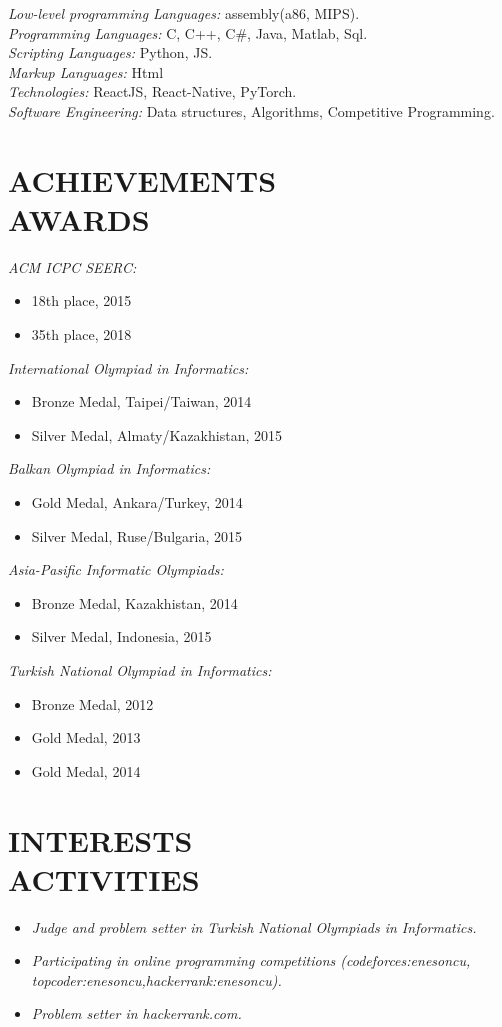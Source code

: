 \documentclass[margin, 10pt]{res} %
\begin{document}
\begin{resume}
{\sl Low-level programming Languages:} assembly(a86, MIPS). \\
{\sl Programming Languages:} C, C++, C#, Java, Matlab, Sql. \\
{\sl Scripting Languages:} Python, JS. \\
{\sl Markup Languages:} Html \\
{\sl Technologies:} ReactJS, React-Native, PyTorch. \\
{\sl Software Engineering:} Data structures, Algorithms, Competitive Programming.

\section{ACHIEVEMENTS \\ AWARDS}
{\sl ACM ICPC SEERC:} 
\begin{itemize}
	\item 18th place, 2015
	\item 35th place, 2018
\end{itemize}

{\sl International Olympiad in Informatics:}
\begin{itemize}
	\item Bronze Medal, Taipei/Taiwan, 2014
    \item Silver Medal, Almaty/Kazakhistan, 2015
\end{itemize}

{\sl Balkan Olympiad in Informatics:}
\begin{itemize}
	\item Gold Medal, Ankara/Turkey, 2014
    \item Silver Medal, Ruse/Bulgaria, 2015
\end{itemize}

{\sl Asia-Pasific Informatic Olympiads:}
\begin{itemize}
	\item Bronze Medal, Kazakhistan, 2014
    \item Silver Medal, Indonesia, 2015
\end{itemize}

{\sl Turkish National Olympiad in Informatics:}
\begin{itemize}
	\item Bronze Medal, 2012
    \item Gold Medal, 2013
    \item Gold Medal, 2014
\end{itemize}

\section{INTERESTS \\ ACTIVITIES}
\begin{itemize}
  \item {\sl Judge and problem setter in Turkish National Olympiads in Informatics.}
  \item {\sl Participating in online programming competitions (codeforces:enesoncu, topcoder:enesoncu,hackerrank:enesoncu).}
  \item {\sl Problem setter in hackerrank.com.}
\end{itemize}


\end{resume}
\end{document}
